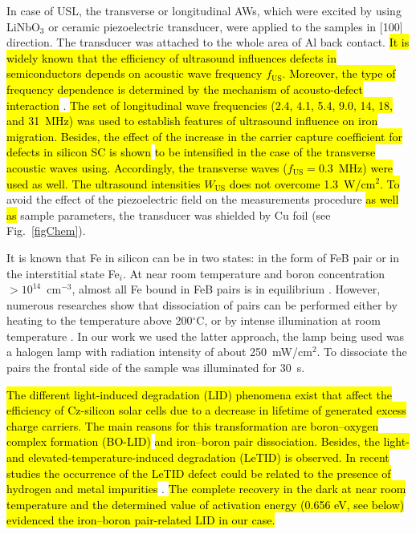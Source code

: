 \documentclass[sn-mathphys]{sn-jnl}%
\theoremstyle{thmstyleone}%
\theoremstyle{thmstyletwo}%
\theoremstyle{thmstylethree}%
\begin{document}
In case of USL, the transverse or longitudinal AWs, which were excited by using LiNbO$_3$ or ceramic piezoelectric transducer,
were applied to the samples in [100] direction.
The transducer was attached to the whole area of Al back contact.
\hl{It is widely known that the efficiency of ultrasound influences defects
in semiconductors depends on acoustic wave frequency $f_\mathrm{US}$.
Moreover, the type of frequency dependence is determined by the mechanism of acousto-defect
interaction} \cite{Brailsford,Pavlovich,PeleshchakUJF2016}.
\hl{ The set of longitudinal wave frequencies (2.4, 4.1, 5.4, 9.0, 14, 18, and 31~MHz)
was used  to establish features of
ultrasound influence on iron migration.
Besides,  the effect of the increase in the carrier capture coefficient for defects in silicon SC
is shown} \cite{Olikh2018SM} \hl{ to be intensified in the case of the transverse acoustic waves using.
Accordingly, the transverse waves ($f_\mathrm{US}=0.3$~MHz) were used as well.
The ultrasound intensities $W_\mathrm{US}$  does not overcome 1.3~W/cm$^2$.
To} avoid the effect of the piezoelectric field on the measurements procedure \hl{as well as} sample parameters,
the transducer was shielded by Cu foil (see Fig.~\ref{figChem}).

It is known that Fe in silicon can be in two states:
in the form of FeB pair or in the interstitial state Fe$_i$.
At near room temperature and boron concentration $>10^{14}$~cm$^{-3}$,
almost all Fe bound in FeB pairs is in equilibrium \cite{FeB:kinetic,FeBAssJAP2014,FeBAssSST2011,FeBJAP2005}.
However, numerous researches show that dissociation of pairs can be performed either by heating to the temperature above 200$^\circ$C,
or by intense illumination at room temperature \cite{FeBAssJAP2014,FeBJAP2005}.
In our work we used the latter approach, the lamp being used was a halogen lamp with radiation intensity of about 250~mW/cm$^2$.
To dissociate the pairs the frontal side of the sample was illuminated for 30~s.

\hl{The different light-induced degradation (LID) phenomena exist that affect the efficiency
of Cz-silicon solar cells due to a decrease in lifetime of generated excess charge carriers.
The main reasons for this transformation are boron--oxygen complex formation (BO-LID)} \cite{LIDRev} 
\hl{ and
iron--boron pair dissociation.
Besides, the light- and elevated-temperature-induced degradation (LeTID) is observed.
In recent studies the occurrence of the LeTID defect could be related
to the presence of hydrogen and metal impurities }\cite{LeTID_H,LeTID_Me,LeTID_Me2}.
\hl{ The complete  recovery in the dark at near room temperature and the determined value
of activation energy (0.656 eV, see below) evidenced the iron--boron pair-related LID in our case.}
\end{document}
